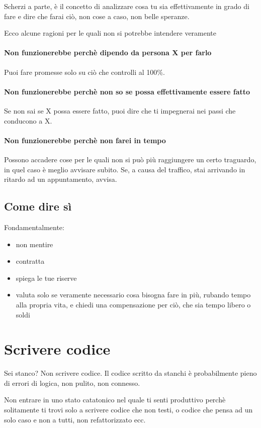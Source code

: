 \documentclass[11pt,a4paper]{book}
\begin{document}
Scherzi a parte, è il concetto di analizzare cosa tu sia effettivamente in grado di fare e dire che farai ciò, non cose a caso, non belle speranze.

Ecco alcune ragioni per le quali non si potrebbe intendere veramente
\subsubsection{Non funzionerebbe perchè dipendo da persona X per farlo}
Puoi fare promesse solo su ciò che controlli al 100\%.

\subsubsection{Non funzionerebbe perchè non so se possa effettivamente essere fatto}
Se non sai se X possa essere fatto, puoi dire che ti impegnerai nei passi che conducono a X.

\subsubsection{Non funzionerebbe perchè non farei in tempo}
Possono accadere cose per le quali non si può più raggiungere un certo traguardo, in quel caso è meglio avvisare subito. Se, a causa del traffico, stai arrivando in ritardo ad un appuntamento, avvisa.

\section{Come dire sì}
Fondamentalmente:
\begin{itemize}
	\item non mentire
	\item contratta
	\item spiega le tue riserve
	\item valuta solo se veramente necessario cosa bisogna fare in più, rubando tempo alla propria vita, e chiedi una compensazione per ciò, che sia tempo libero o soldi
\end{itemize}

\chapter{Scrivere codice}
Sei stanco? Non scrivere codice. Il codice scritto da stanchi è probabilmente pieno di errori di logica, non pulito, non connesso.

Non entrare in uno stato catatonico nel quale ti senti produttivo perchè solitamente ti trovi solo a scrivere codice che non testi, o codice che pensa ad un solo caso e non a tutti, non refattorizzato ecc.
\end{document}
